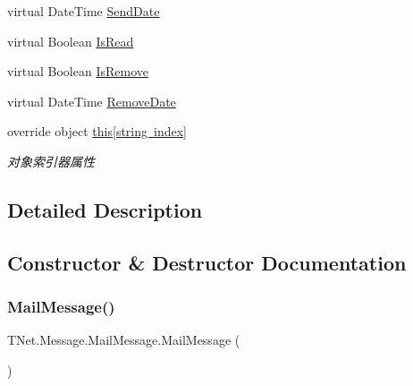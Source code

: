 \begin{DoxyCompactItemize}
virtual Date\+Time \mbox{\hyperlink{class_t_net_1_1_message_1_1_mail_message_a181b3f56e8873024506083d521f281ef}{Send\+Date}}
\item 
virtual Boolean \mbox{\hyperlink{class_t_net_1_1_message_1_1_mail_message_a44ccc0593aef1db2e0c08b47f98ea515}{Is\+Read}}
\item 
virtual Boolean \mbox{\hyperlink{class_t_net_1_1_message_1_1_mail_message_ac738bbd5870868473c19c398b76e2efe}{Is\+Remove}}
\item 
virtual Date\+Time \mbox{\hyperlink{class_t_net_1_1_message_1_1_mail_message_a3e1a285d81e4da0eb583813901326a49}{Remove\+Date}}
\item 
override object \mbox{\hyperlink{class_t_net_1_1_message_1_1_mail_message_ad1b64bf2b2b019997dbe8d3227c3f5cd}{this\mbox{[}string index\mbox{]}}}
\begin{DoxyCompactList}\small\item\em 对象索引器属性 \end{DoxyCompactList}\end{DoxyCompactItemize}


\subsection{Detailed Description}




\subsection{Constructor \& Destructor Documentation}
\mbox{\label{class_t_net_1_1_message_1_1_mail_message_a61bf251d51f3dba7e2fd14eda4bfbc5a}} 
\subsubsection{\texorpdfstring{Mail\+Message()}{MailMessage()}\hspace{0.1cm}{\footnotesize\ttfamily [1/2]}}
{\footnotesize\ttfamily T\+Net.\+Message.\+Mail\+Message.\+Mail\+Message (\begin{DoxyParamCaption}{ }\end{DoxyParamCaption})}





